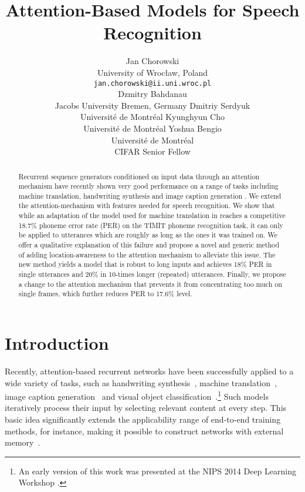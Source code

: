 \documentclass{article}
\title{Attention-Based Models for Speech Recognition}
\author{
Jan Chorowski \\
University of Wroc\l{}aw, Poland\\
\texttt{jan.chorowski@ii.uni.wroc.pl} \\
\And
Dzmitry Bahdanau \\
Jacobs University Bremen, Germany
\And
Dmitriy  Serdyuk \\
Universit\'{e} de Montr\'{e}al
\And
Kyunghyun Cho\\
Universit\'{e} de Montr\'{e}al
\And
Yoshua Bengio \\
Universit\'{e} de Montr\'{e}al \\
CIFAR Senior Fellow
}
\begin{document}
\maketitle

\begin{abstract}
Recurrent sequence generators conditioned on input data through an attention
mechanism have recently shown very good performance on a range of tasks
including machine translation, handwriting synthesis
\cite{graves_generating_2013,bahdanau_neural_2014} and image caption generation
\cite{xu_show_2015}. We extend the attention-mechanism with features needed for speech
recognition. We show that while an adaptation of the model used for machine
translation in \cite{bahdanau_neural_2014} reaches a competitive 18.7\% phoneme
error rate (PER) on the TIMIT phoneme recognition task, it can only be applied to utterances which are
roughly as long as the ones it was trained on. We offer a qualitative
explanation of this failure 
and propose a novel and generic method of adding
location-awareness to the attention mechanism to alleviate this issue. The new
method yields a model that is robust to long inputs and achieves 18\% PER in single
utterances and 20\% in 10-times longer (repeated) utterances.  Finally, we
propose a change to the attention mechanism that prevents it from concentrating
too much on single frames, which further reduces PER to 17.6\% level. 
\end{abstract}

\section{Introduction}

Recently, attention-based recurrent networks have been successfully applied to a
wide variety of tasks, such as handwriting
synthesis~\cite{graves_generating_2013}, machine
translation~\cite{bahdanau_neural_2014}, image caption
generation~\cite{xu_show_2015} and  visual object
classification~\cite{mnih_2014}.\footnote{An early version of this work was presented at the NIPS 2014 Deep Learning
  Workshop \cite{chorowski_2014}.
}
Such models iteratively process their input by selecting relevant content at
every step. This basic idea significantly extends the applicability range of
end-to-end training methods, for instance, making it possible to construct
networks with external memory~\cite{graves_2014,weston_2014}.
\end{document}
